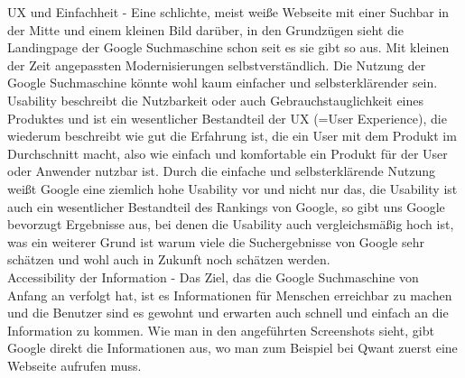UX und Einfachheit - Eine schlichte, meist weiße Webseite mit einer Suchbar in der Mitte und einem kleinen Bild darüber,
in den Grundzügen sieht die Landingpage der Google Suchmaschine schon seit es sie gibt so aus.
Mit kleinen der Zeit angepassten Modernisierungen selbstverständlich.
Die Nutzung der Google Suchmaschine könnte wohl kaum einfacher und selbsterklärender sein.
Usability beschreibt die Nutzbarkeit oder auch Gebrauchstauglichkeit eines Produktes und ist ein wesentlicher Bestandteil der UX (=User Experience),
die wiederum beschreibt wie gut die Erfahrung ist, die ein User mit dem Produkt im Durchschnitt macht, also wie einfach und komfortable ein Produkt für der User oder Anwender nutzbar ist.\cite{Maulhardt.20220621}
Durch die einfache und selbsterklärende Nutzung weißt Google eine ziemlich hohe Usability vor und nicht nur das,
die Usability ist auch ein wesentlicher Bestandteil des Rankings von Google, so gibt uns Google bevorzugt Ergebnisse aus, bei denen die Usability auch vergleichsmäßig hoch ist,
was ein weiterer Grund ist warum viele die Suchergebnisse von Google sehr schätzen und wohl auch in Zukunft noch schätzen werden.\cite{LIC15}\\

Accessibility der Information - Das Ziel, das die Google Suchmaschine von Anfang an verfolgt hat,
ist es Informationen für Menschen erreichbar zu machen und die Benutzer sind es gewohnt und erwarten auch schnell und einfach an die Information zu kommen.
Wie man in den angeführten Screenshots sieht, gibt Google direkt die Informationen aus, wo man zum Beispiel bei Qwant zuerst eine Webseite aufrufen muss.
